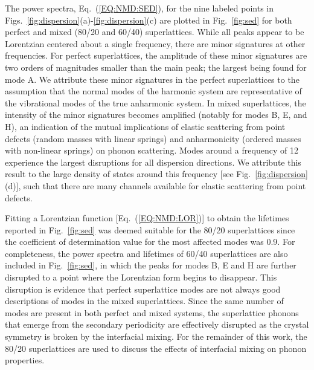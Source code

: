 \documentclass[aps,prb,preprint,preprintnumbers,amsmath,amssymb,floatfix,superscriptaddress]{revtex4}
\begin{document}
The power spectra, Eq.~(\ref{EQ:NMD:SED}), for the nine labeled points in Figs.~\ref{fig:dispersion}(a)-\ref{fig:dispersion}(c) are plotted in Fig.~\ref{fig:sed} for both perfect and mixed (80/20 and 60/40) superlattices. While all peaks appear to be Lorentzian centered about a single frequency, there are minor signatures at other frequencies. For perfect superlattices, the amplitude of these minor signatures are two orders of magnitudes smaller than the main peak; the largest being found for mode A. We attribute these minor signatures in the perfect superlattices to the assumption that the normal modes of the harmonic system are representative of the vibrational modes of the true anharmonic system. In mixed superlattices, the intensity of the minor signatures becomes amplified (notably for modes B, E, and H), an indication of the mutual implications of elastic scattering from point defects (random masses with linear springs) and anharmonicity (ordered masses with non-linear springs) on phonon scattering. \cite{RevModPhys.53.175}  Modes around a frequency of 12 experience the largest disruptions for all dispersion directions. We attribute this result to the large density of states around this frequency [see Fig.~\ref{fig:dispersion}(d)], such that there are many channels available for elastic scattering from point defects.\cite{tamura_isotope_1983} 

Fitting a Lorentzian function [Eq.~(\ref{EQ:NMD:LOR})] to obtain the lifetimes reported in Fig.~\ref{fig:sed} was deemed suitable for the 80/20 superlattices since the coefficient of determination value \cite{Cowpe20081066} for the most affected modes was 0.9. For completeness, the power spectra and lifetimes of 60/40 superlattices are also included in Fig.~\ref{fig:sed}, in which the peaks for modes B, E and H are further disrupted to a point where the Lorentzian form begins to disappear. This disruption is evidence that perfect superlattice modes are not always good descriptions of modes in the mixed superlattices. Since the same number of modes are present in both perfect and mixed systems, the superlattice phonons that emerge from the secondary periodicity are effectively disrupted as the crystal symmetry is broken by the interfacial mixing. For the remainder of this work, the 80/20 superlattices are used to discuss the effects of interfacial mixing on phonon properties.
\renewcommand{\topfraction}{1.0}
\begin{figure*}%
\begin{center}
\renewcommand{\figure}{Fig.}
\caption{Power spectra for selected modes of the $4\times 4$ perfect and mixed superlattices [indicated by the labeled gray square markers in Figs.~\ref{fig:dispersion}(a)-\ref{fig:dispersion}(c)]. Dark blue corresponds to a perfect superlattice, red corresponds to mixing of 80/20, and light blue corresponds to mixing of 60/40. Reported lifetimes calculated from the fitting of the Lorentzian functions (not shown) are also included. By removing a single MD seed, the average uncertainty in the fitting was determined to be 7.5\%.}
\label{fig:sed}
\end{center}
\end{figure*}
\end{document}

